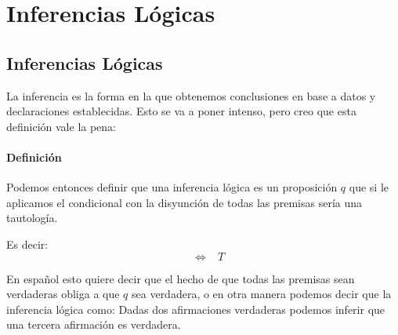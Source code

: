 \documentclass[12pt, fleqn]{report}                             %
\DeclareMathOperator \Space     {\quad}                         %
\DeclareMathOperator \MiniSpace {\;}                            %
\theoremstyle{break}                                            %
\newcommand \lEqual  {\MiniSpace \Leftrightarrow \MiniSpace}    %
\begin{document}
    \clearpage
    \chapter{Inferencias Lógicas}
        \clearpage

        
        \section{Inferencias Lógicas}

            La inferencia es la forma en la que obtenemos conclusiones en base a datos y declaraciones establecidas.
            Esto se va a poner intenso, pero creo que esta definición vale la pena:

            \subsubsection{Definición}

                Podemos entonces definir que una inferencia lógica es un proposición $q$ que si le aplicamos
                el condicional con la disyunción de todas las premisas sería una tautología.

                Es decir:
                \begin{equation*}
                    [p_1 \land p_2 \land p_3 \dots \to q] \lEqual T
                \end{equation*}

                En español esto quiere decir que el hecho de que todas las premisas sean verdaderas obliga a
                que $q$ sea verdadera, o en otra manera podemos decir que la inferencia lógica como: 
                Dadas dos afirmaciones verdaderas podemos inferir que una tercera afirmación es verdadera.


\end{document}
